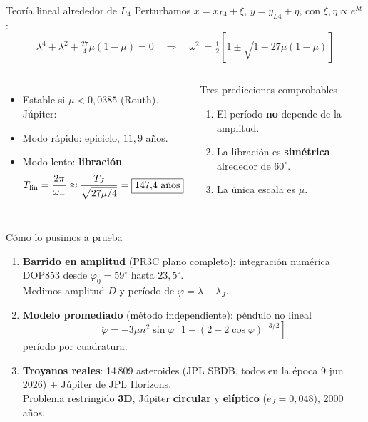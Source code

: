\documentclass[aspectratio=169, 11pt]{beamer}
\begin{document}
\begin{frame}{Teoría lineal alrededor de $L_4$}
Perturbamos $x=x_{L4}+\xi$, $y=y_{L4}+\eta$, con $\xi,\eta\propto e^{\lambda t}$:
\[
\lambda^4+\lambda^2+\tfrac{27}{4}\mu(1-\mu)=0
\quad\Rightarrow\quad
\omega_\pm^2=\tfrac12\left[1\pm\sqrt{1-27\mu(1-\mu)}\right]
\]
\begin{columns}[t]
\begin{itemize}
\item Estable si $\mu<0{,}0385$ (Routh). Júpiter: \checkmark
\item Modo rápido: epiciclo, $11{,}9$ años.
\item Modo lento: \textbf{libración}
\[ T_{\rm lin}=\frac{2\pi}{\omega_-}\approx\frac{T_J}{\sqrt{27\mu/4}}=\boxed{147{,}4\ \text{años}} \]
\end{itemize}
\begin{alertblock}{Tres predicciones comprobables}
\begin{enumerate}
\item El período \textbf{no} depende de la amplitud.
\item La libración es \textbf{simétrica} alrededor de $60^\circ$.
\item La única escala es $\mu$.
\end{enumerate}
\end{alertblock}
\end{columns}
\end{frame}

\begin{frame}{Cómo lo pusimos a prueba}
\begin{enumerate}
\item \textbf{Barrido en amplitud} (PR3C plano completo): integración numérica DOP853 desde $\varphi_0=59^\circ$ hasta $23{,}5^\circ$.\\
Medimos amplitud $D$ y período de $\varphi=\lambda-\lambda_J$.
\item \textbf{Modelo promediado} (método independiente): péndulo no lineal
\[\ddot\varphi=-3\mu n^2\sin\varphi\left[1-(2-2\cos\varphi)^{-3/2}\right]\]
período por cuadratura.
\item \textbf{Troyanos reales}: 14\,809 asteroides (JPL SBDB, todos en la época 9 jun 2026) + Júpiter de JPL Horizons.\\
Problema restringido \textbf{3D}, Júpiter \textbf{circular} y \textbf{elíptico} ($e_J=0{,}048$), 2000 años.
\end{enumerate}
\end{frame}
\end{document}
